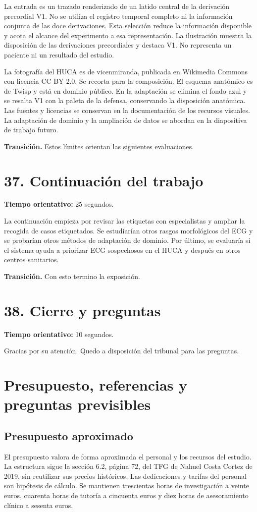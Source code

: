 \documentclass[11pt,a4paper]{article}
\begin{document}
La entrada es un trazado renderizado de un latido central de la derivación precordial V1. No se utiliza el registro temporal completo ni la información conjunta de las doce derivaciones. Esta selección reduce la información disponible y acota el alcance del experimento a esa representación. La ilustración muestra la disposición de las derivaciones precordiales y destaca V1. No representa un paciente ni un resultado del estudio.

La fotografía del HUCA es de vicenmiranda, publicada en Wikimedia Commons con licencia CC BY 2.0. Se recorta para la composición. El esquema anatómico es de Twisp y está en dominio público. En la adaptación se elimina el fondo azul y se resalta V1 con la paleta de la defensa, conservando la disposición anatómica. Las fuentes y licencias se conservan en la documentación de los recursos visuales. La adaptación de dominio y la ampliación de datos se abordan en la diapositiva de trabajo futuro.

\textbf{Transición.} Estos límites orientan las siguientes evaluaciones.

\section*{37. Continuación del trabajo}
\textbf{Tiempo orientativo: }25 segundos.

La continuación empieza por revisar las etiquetas con especialistas y ampliar la recogida de casos etiquetados. Se estudiarían otros rasgos morfológicos del ECG y se probarían otros métodos de adaptación de dominio. Por último, se evaluaría si el sistema ayuda a priorizar ECG sospechosos en el HUCA y después en otros centros sanitarios.

\textbf{Transición.} Con esto termino la exposición.

\section*{38. Cierre y preguntas}
\textbf{Tiempo orientativo: }10 segundos.

Gracias por su atención. Quedo a disposición del tribunal para las preguntas.

\clearpage\section*{Presupuesto, referencias y preguntas previsibles}
\subsection*{Presupuesto aproximado}
El presupuesto valora de forma aproximada el personal y los recursos del estudio. La estructura sigue la sección 6.2, página 72, del TFG de Nahuel Costa Cortez de 2019, sin reutilizar sus precios históricos. Las dedicaciones y tarifas del personal son hipótesis de cálculo. Se mantienen trescientas horas de investigación a veinte euros, cuarenta horas de tutoría a cincuenta euros y diez horas de asesoramiento clínico a sesenta euros.
\end{document}

